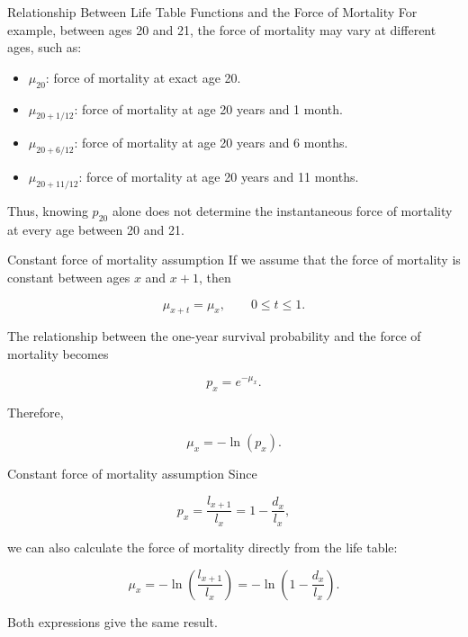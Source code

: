 \documentclass[
  ignorenonframetext,
  aspectratio=169,
]{beamer}
\providecommand{\tightlist}{%
  \setlength{\itemsep}{0pt}\setlength{\parskip}{0pt}}
\begin{document}
\begin{frame}{Relationship Between Life Table Functions and the Force of
Mortality}
\protect{}\label{relationship-between-life-table-functions-and-the-force-of-mortality-1}
For example, between ages 20 and 21, the force of mortality may vary at
different ages, such as:

\begin{itemize}
\tightlist
\item
  \(\mu_{20}\): force of mortality at exact age 20.
\item
  \(\mu_{20+1/12}\): force of mortality at age 20 years and 1 month.
\item
  \(\mu_{20+6/12}\): force of mortality at age 20 years and 6 months.
\item
  \(\mu_{20+11/12}\): force of mortality at age 20 years and 11 months.
\end{itemize}

Thus, knowing \(p_{20}\) alone does not determine the instantaneous
force of mortality at every age between 20 and 21.
\end{frame}

\begin{frame}{Constant force of mortality assumption}
\protect{}\label{constant-force-of-mortality-assumption}
If we assume that the force of mortality is constant between ages \(x\)
and \(x+1\), then

\[
\mu_{x+t}=\mu_x,
\qquad 0\leq t\leq 1.
\]

The relationship between the one-year survival probability and the force
of mortality becomes

\[
p_x=e^{-\mu_x}.
\]

Therefore,

\[
\boxed{\mu_x=-\ln(p_x).}
\]
\end{frame}

\begin{frame}{Constant force of mortality assumption}
\protect{}\label{constant-force-of-mortality-assumption-1}
Since

\[
p_x=\frac{l_{x+1}}{l_x}
=1-\frac{d_x}{l_x},
\]

we can also calculate the force of mortality directly from the life
table:

\[
\boxed{
\mu_x
=-\ln\left(\frac{l_{x+1}}{l_x}\right)
=-\ln\left(1-\frac{d_x}{l_x}\right).
}
\]

Both expressions give the same result.
\end{frame}
\end{document}
